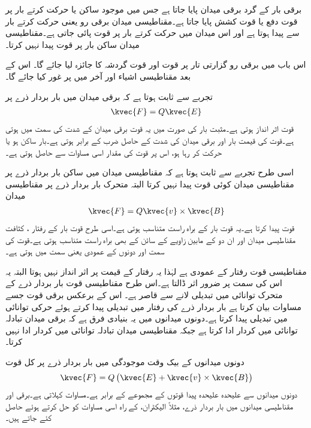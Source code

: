 برقی بار کے گرد برقی میدان پایا جاتا ہے جس میں موجود ساکن یا حرکت کرتے بار پر قوت دفع یا قوت کشش پایا جاتا ہے۔مقناطیسی میدان برقی رو یعنی حرکت کرتے بار سے پیدا ہوتا ہے اور اس میدان میں حرکت کرتے بار پر قوت پائی جاتی ہے۔مقناطیسی میدان ساکن بار پر قوت پیدا نہیں کرتا۔

اس باب میں برقی رو گزارتی تار پر قوت اور قوت گردشہ  کا جائزہ لیا جائے گا۔ اس کے بعد مقناطیسی اشیاء اور آخر میں پر غور کیا جائے گا۔

تجربے سے  ثابت ہوتا ہے کہ برقی میدان میں بار بردار ذرے  پر 
\begin{align}\label{مساوات_امالہ_برقی_قوت}
\kvec{F}=Q \kvec{E}
\end{align}
قوت اثر انداز ہوتی ہے۔مثبت بار کی صورت میں یہ قوت برقی میدان کے شدت  کی سمت میں ہوتی ہے۔قوت کی قیمت بار  اور برقی میدان کی شدت  کے حاصل ضرب کے برابر ہوتی ہے۔بار ساکن ہو یا حرکت کر رہا ہو، اس پر قوت کی مقدار اسی مساوات سے حاصل ہوتی ہے۔

اسی طرح تجربے سے ثابت ہوتا ہے کہ مقناطیسی میدان میں ساکن بار بردار ذرے  پر مقناطیسی میدان کوئی قوت پیدا نہیں کرتا البتہ متحرک بار بردار ذرے  پر مقناطیسی میدان
\begin{align}\label{مساوات_امالہ_مقناطیسی_قوت}
\kvec{F}=Q \kvec{v} \times \kvec{B} 
\end{align}
قوت پیدا کرتا ہے۔یہ قوت بار  کے براہ راست متناسب ہوتی ہے۔اسی طرح قوت بار کے رفتار ،  کثافت مقناطیسی میدان  اور ان دو کے مابین زاویے کے سائن کے بھی براہ راست متناسب ہوتی ہے۔قوت کی سمت  اور  دونوں کے عمودی یعنی  سمت میں ہوتی ہے۔

مقناطیسی قوت رفتار کے عمودی ہے لہٰذا یہ رفتار کے قیمت پر اثر انداز نہیں ہوتا البتہ یہ اس کی سمت پر ضرور اثر ڈالتا ہے۔اس طرح مقناطیسی قوت بار بردار ذرے کے متحرک توانائی میں تبدیلی لانے سے قاصر ہے۔ اس کے برعکس برقی قوت جسے مساوات  بیان کرتا ہے بار بردار ذرے کی رفتار میں تبدیلی پیدا کرتے ہوئے حرکی توانائی میں تبدیلی پیدا کرتا ہے۔دونوں میدانوں میں یہ بنیادی فرق ہے کہ برقی میدان تبادلہ توانائی میں کردار ادا کرتا ہے جبکہ مقناطیسی میدان تبادلہ توانائی میں کردار ادا نہیں کرتا۔

دونوں میدانوں کے بیک وقت موجودگی میں بار بردار ذرے پر کل قوت
\begin{align}\label{مساوات_امالہ_لورنز}
\kvec{F}=Q\left(\kvec{E}+\kvec{v} \times \kvec{B} \right)
\end{align}
دونوں میدانوں سے علیحدہ علیحدہ پیدا قوتوں کے مجموعے کے برابر ہے۔مساوات   کہلاتی ہے۔برقی اور مقناطیسی میدانوں میں بار بردار ذرے، مثلاً الیکٹران، کے راہ اسی مساوات کو حل کرتے ہوئے حاصل کئے جاتے ہیں۔


